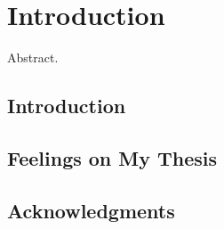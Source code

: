 \chapter{Introduction}
\label{c.intro}

Abstract.

\section{Introduction}


\section{Feelings on My Thesis}



\section*{Acknowledgments}

